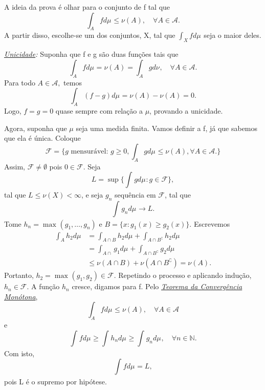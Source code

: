 \documentclass[measure_theory.tex]{subfiles}
\begin{document}
\begin{proof*}
	A ideia da prova é olhar para o conjunto de f tal que
	\[
		\int_{A}f d\mu_{} \leq \nu(A),\quad \forall A\in \mathcal{A}.
	\]
	A partir disso, escolhe-se um dos conjuntos, X, tal que \(\int_{X}f d\mu_{}\) seja o maior deles.

	\textit{\underline{Unicidade}:} Suponha que f e g são duas funções tais que
	\[
		\int_{A}f d\mu_{} = \nu (A) = \int_{A}g d\nu_{},\quad \forall A\in \mathcal{A}.
	\]
	Para todo \(A\in \mathcal{A},\) temos
	\[
		\int_{A}(f-g) d\mu_{} = \nu (A) - \nu(A) = 0.
	\]
	Logo, \(f = g = 0\) quase sempre com relação a \(\mu \), provando a unicidade.

	Agora, suponha que \(\mu \) seja uma medida finita. Vamos definir a f, já que sabemos que ela é única. Coloque
	\[
		\mathcal{F} = \{g \text{ mensurável: } g\geq 0, \int_{A}g d\mu_{}\leq \nu (A), \forall A\in \mathcal{A}.\}
	\]
	Assim, \(\mathcal{F}\neq\emptyset\) pois \(0\in \mathcal{F}.\) Seja
	\[
		L = \sup_{}\biggl\{\int_{}g d\mu_{}: g\in \mathcal{F}\biggr\},
	\]
	tal que \(L\leq \nu (X) < \infty\), e seja \(g_{n}\) sequência em \(\mathcal{F}\), tal que
	\[
		\int_{}g_{n} d\mu_{}\to L.
	\]
	Tome \(h_{n} = \max_{}(g_1, \dotsc , g_{n})\) e \(B = \{x: g_1(x) \geq g_2(x)\}\). Escrevemos
	\begin{align*}
		\int_{A}h_2 d\mu_{} & = \int_{A\cap B}h_2 d\mu_{} + \int_{A\cap B ^{\complement}}h_2 d\mu_{} \\
		                    & = \int_{A\cap }g_1 d\mu_{} + \int_{A\cap B ^{\complement}}g_2 d\mu_{}  \\
		                    & \leq \nu (A\cap B) + \nu (A\cap B ^{\complement}) = \nu (A).
	\end{align*}
	Portanto, \(h_2=\max_{}(g_1, g_2)\in \mathcal{F}\). Repetindo o processo e aplicando indução, \(h_{n}\in \mathcal{F}.\) A função \(h_{n}\) cresce, digamos para f. Pelo \hyperlink{monotone_convergence}{\textit{Teorema da Convergência Monótona}},
	\[
		\int_{A}f d\mu_{}\leq \nu (A), \quad \forall A\in \mathcal{A}
	\]
	e
	\[
		\int_{}f d\mu_{} \geq \int_{}h_{n} d\mu_{}\geq \int_{}g_{n} d\mu_{},\quad \forall n\in \mathbb{N}.
	\]
	Com isto,
	\[
		\int_{}f d\mu_{} = L,
	\]
	pois L é o supremo por hipótese.


\end{proof*}
\end{document}
